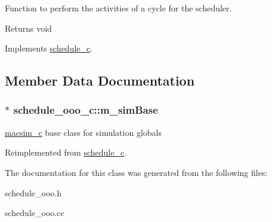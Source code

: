 Function to perform the activities of a cycle for the scheduler. 

\begin{DoxyReturn}{Returns}
void 
\end{DoxyReturn}


Implements \hyperlink{classschedule__c_abaede0d6b5e70e5cfc6bf98801e387e1}{schedule\_\-c}.



\subsection{Member Data Documentation}
\hypertarget{classschedule__ooo__c_a0b06680167ffaa41d348215de2144d29}{
\subsubsection[{m\_\-simBase}]{$\ast$ {\bf schedule\_\-ooo\_\-c::m\_\-simBase}}}
\label{classschedule__ooo__c_a0b06680167ffaa41d348215de2144d29}
\hyperlink{classmacsim__c}{macsim\_\-c} base class for simulation globals 

Reimplemented from \hyperlink{classschedule__c_a0db71234050b2c33f454b5d65d458564}{schedule\_\-c}.



The documentation for this class was generated from the following files:\begin{DoxyCompactItemize}
\item 
schedule\_\-ooo.h\item 
schedule\_\-ooo.cc\end{DoxyCompactItemize}
